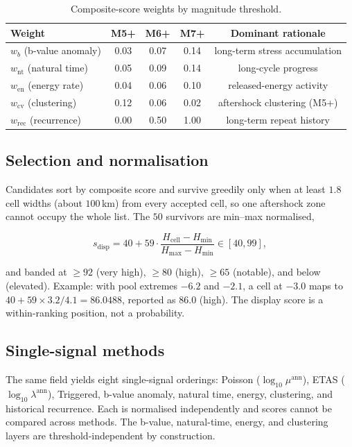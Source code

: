 \documentclass[11pt,a4paper]{article}
\begin{document}
\begin{table}[h]
\centering
\caption{Composite-score weights by magnitude threshold.}
\label{tab:weights}
\begin{tabular}{lcccc}
\toprule
Weight & M5+ & M6+ & M7+ & Dominant rationale\\
\midrule
$w_b$ (b-value anomaly) & 0.03 & 0.07 & 0.14 & long-term stress accumulation\\
$w_{\mathrm{nt}}$ (natural time) & 0.05 & 0.09 & 0.14 & long-cycle progress\\
$w_{\mathrm{en}}$ (energy rate) & 0.04 & 0.06 & 0.10 & released-energy activity\\
$w_{\mathrm{cv}}$ (clustering) & 0.12 & 0.06 & 0.02 & aftershock clustering (M5+)\\
$w_{\mathrm{rec}}$ (recurrence) & 0.00 & 0.50 & 1.00 & long-term repeat history\\
\bottomrule
\end{tabular}
\end{table}

\subsection{Selection and normalisation}
Candidates sort by composite score and survive greedily only when at least
$1.8$ cell widths (about $100$\,km) from every accepted cell, so one
aftershock zone cannot occupy the whole list. The $50$ survivors are min--max
normalised,

\begin{equation}
s_{\text{disp}}=40+59\cdot
\frac{H_{\text{cell}}-H_{\min}}{H_{\max}-H_{\min}}\in[40,99],
\end{equation}

and banded at $\ge92$ (very high), $\ge80$ (high), $\ge65$ (notable), and
below (elevated). Example: with pool extremes $-6.2$ and $-2.1$, a cell at
$-3.0$ maps to $40+59\times3.2/4.1=86.0488$, reported as $86.0$ (high). The
display score is a within-ranking position, not a probability.

\subsection{Single-signal methods}
The same field yields eight single-signal orderings: Poisson
($\log_{10}\mu^{\text{ann}}$), ETAS ($\log_{10}\lambda^{\text{ann}}$),
Triggered, b-value anomaly, natural time, energy, clustering, and historical
recurrence. Each is normalised independently and scores cannot be compared
across methods. The b-value, natural-time, energy, and clustering layers are
threshold-independent by construction.
\end{document}
